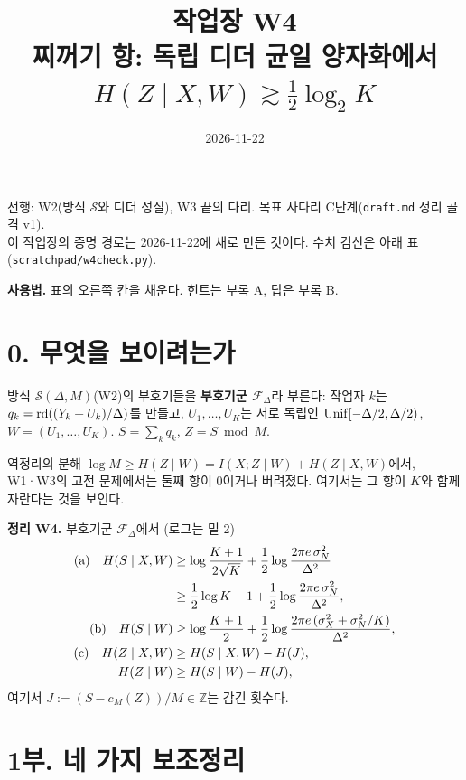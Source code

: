 
\title{\sffamily 작업장 W4\\[2pt]\large 찌꺼기 항: 독립 디더 균일 양자화에서 $H(Z\mid X,W)\gtrsim\tfrac12\log_2K$}
\author{}
\date{2026-11-22}

\maketitle
\vspace{-2.5em}
\begin{center}\small
선행: W2(방식 $\mathcal S$와 디더 성질), W3 끝의 다리. 목표 사다리 C단계(\texttt{draft.md} 정리 골격 v1).\\
이 작업장의 증명 경로는 2026-11-22에 새로 만든 것이다. 수치 검산은 아래 표(\texttt{scratchpad/w4check.py}).
\end{center}

\textbf{사용법.} 표의 오른쪽 칸을 채운다. 힌트는 부록 A, 답은 부록 B.

\section*{0. 무엇을 보이려는가}
방식 $\mathcal S(\Delta,M)$(W2)의 부호기들을 \textbf{부호기군 $\mathcal F_\Delta$}라 부른다: 작업자 $k$는 $q_k=\operatorname{rd}((Y_k+U_k)/\Delta)$를 만들고, $U_1,\dots,U_K$는 서로 독립인 $\operatorname{Unif}[-\Delta/2,\Delta/2)$, $W=(U_1,\dots,U_K)$. $S=\sum_kq_k$, $Z=S\bmod M$.

역정리의 분해 $\log M\ge H(Z\mid W)=I(X;Z\mid W)+H(Z\mid X,W)$에서, W1·W3의 고전 문제에서는 둘째 항이 0이거나 버려졌다. 여기서는 그 항이 $K$와 함께 자란다는 것을 보인다.

\begin{thmbox}
\textbf{정리 W4.} 부호기군 $\mathcal F_\Delta$에서 (로그는 밑 2)
\begin{align*}
\text{(a)}\quad H(S\mid X,W)&\ge\log\frac{K+1}{2\sqrt K}+\frac12\log\frac{2\pi e\,\sigma_N^2}{\Delta^2}\\
&\ge\frac12\log K-1+\frac12\log\frac{2\pi e\,\sigma_N^2}{\Delta^2},\\
\text{(b)}\quad H(S\mid W)&\ge\log\frac{K+1}{2}+\frac12\log\frac{2\pi e\,(\sigma_X^2+\sigma_N^2/K)}{\Delta^2},\\
\text{(c)}\quad H(Z\mid X,W)&\ge H(S\mid X,W)-H(J),\\
H(Z\mid W)&\ge H(S\mid W)-H(J),
\end{align*}
여기서 $J:=(S-c_M(Z))/M\in\mathbb Z$는 감긴 횟수다.
\end{thmbox}

\section*{1부. 네 가지 보조정리}


